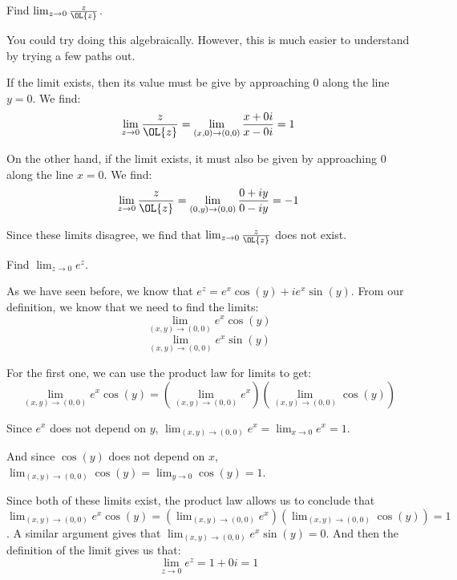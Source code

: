 \begin{ex}{}{} Find $\lim_{z\rightarrow 0} \frac{z}{\OL{z}}$.

You could try doing this algebraically. However, this is much easier to understand by trying a few paths out.

If the limit exists, then its value must be give by approaching $0$ along the line $y = 0$. We find:
$$\lim_{z\rightarrow 0} \frac{z}{\OL{z}} = \lim_{(x,0) \rightarrow (0,0)} \frac{x + 0i}{x-0i} = 1$$

On the other hand, if the limit exists, it must also be given by approaching $0$ along the line $x = 0$. We find:
$$\lim_{z\rightarrow 0} \frac{z}{\OL{z}} = \lim_{(0,y) \rightarrow (0,0)} \frac{0 + iy}{0 - iy} = -1$$
	
Since these limits disagree, we find that $\lim_{z\rightarrow 0} \frac{z}{\OL{z}}$ does not exist.
\end{ex}

\begin{ex}{}{} Find $\lim_{z\rightarrow 0} e^z$.

As we have seen before, we know that $e^z = e^x\cos(y) + ie^x\sin(y)$. From our definition, we know that we need to find the limits:
$$\lim_{(x,y)\rightarrow(0,0)} e^x\cos(y)$$
$$\lim_{(x,y)\rightarrow(0,0)} e^x\sin(y)$$

For the first one, we can use the product law for limits to get:
$$\lim_{(x,y)\rightarrow (0,0)}e^x\cos(y) = \left(\lim_{(x,y)\rightarrow (0,0)}e^x\right)\left(\lim_{(x,y)\rightarrow (0,0)} \cos(y)\right)$$

Since $e^x$ does not depend on $y$, $\lim_{(x,y)\rightarrow (0,0)}e^x = \lim_{x\rightarrow 0}e^x = 1$.

And since $\cos(y)$ does not depend on $x$, $\lim_{(x,y)\rightarrow (0,0)} \cos(y) = \lim_{y\rightarrow 0} \cos(y) = 1$.

Since both of these limits exist, the product law allows us to conclude that $\lim_{(x,y)\rightarrow (0,0)}e^x\cos(y) = \left(\lim_{(x,y)\rightarrow (0,0)}e^x\right)\left(\lim_{(x,y)\rightarrow (0,0)} \cos(y)\right) = 1$. A similar argument gives that $\lim_{(x,y)\rightarrow(0,0)} e^x\sin(y) = 0$. And then the definition of the limit gives us that:
$$\lim_{z\rightarrow 0}e^z = 1 + 0i = 1$$
\end{ex}